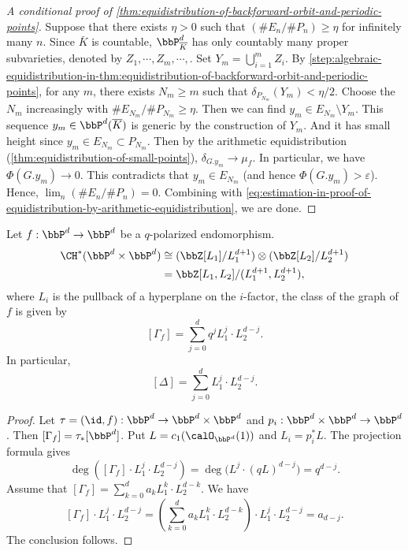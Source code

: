 \begin{proof}[A conditional proof of \cref{thm:equidistribution-of-backforward-orbit-and-periodic-points}]
	Suppose that there exists $\eta > 0$ such that $(\# E_n / \# P_n) \geq \eta$ for infinitely many $n$.
	Since $\bar K$ is countable, $\bbP^d_{\overline{K}}$ has only countably many proper subvarieties, denoted by $Z_1,\cdots,Z_m,\cdots,$.
	Set $Y_m = \bigcup_{i=1}^m Z_i$.
	By \cref{step:algebraic-equidistribution-in-thm:equidistribution-of-backforward-orbit-and-periodic-points}, for any $m$, there exists $N_m \geq m$ such that $\delta_{P_{N_m}}(Y_m) < \eta/2$.
	Choose the $N_m$ increasingly with $\#E_{N_m}/\#P_{N_m} \geq \eta$.
	Then we can find $y_m \in E_{N_m} \setminus Y_m$.
	This sequence $y_m \in \bbP^d(\overline{K})$ is generic by the construction of $Y_m$.
	And it has small height since $y_m \in E_{N_m} \subset P_{N_m}$.
	Then by the arithmetic equidistribution (\cref{thm:equidistribution-of-small-points}), $\delta_{G.y_m} \to \mu_f$.
	In particular, we have $\Phi(G.y_m) \to 0$.
	This contradicts that $y_m \in E_{N_m}$ (and hence $\Phi(G.y_m) > \varepsilon$).
	Hence, $\lim_{n} (\# E_n / \# P_n) = 0$.
	Combining with \cref{eq:estimation-in-proof-of-equidistribution-by-arithmetic-equidistribution}, we are done.
\end{proof}

\begin{lemma}[label=\labelNFM{lem:the-chow-cycle-of-graph-of-f-on-pn}, status=draft, tag=0000000]
	Let $f: \bbP^d \to \bbP^d$ be a $q$-polarized endomorphism.
	\begin{align*}
		\CH^*(\bbP^d\times\bbP^d) & \cong (\bbZ[L_1]/L_1^{d+1})\otimes(\bbZ[L_2]/L_2^{d+1}) \\
		                          & = \bbZ[L_1,L_2]/(L_1^{d+1},L_2^{d+1}),
	\end{align*}
	where $L_i$ is the pullback of a hyperplane on the $i$-factor, the class of the graph of $f$ is given by
	\[ [\Gamma_f] = \sum_{j = 0}^d q^j L_1^{j} \cdot L_2^{d-j}. \]
	In particular,
	\[ [\Delta] = \sum_{j = 0}^d L_1^{j} \cdot L_2^{d-j}. \]
\end{lemma}
\begin{proof}
	Let $\tau = (\id,f): \bbP^d \to \bbP^d \times \bbP^d$ and $p_i: \bbP^d \times \bbP^d \to \bbP^d$.
	Then $[\Gamma_f] = \tau_*[\bbP^d]$.
	Put $L = c_1(\calO_{\bbP^d}(1))$ and $L_i = p_i^*L$.
	The projection formula gives
	\[ \deg([\Gamma_f]\cdot L_1^j\cdot L_2^{d-j}) = \deg\bigl(L^j\cdot(qL)^{d-j}\bigr) = q^{d-j}. \]
	Assume that $[\Gamma_f] = \sum_{k = 0}^d a_k L_1^{k} \cdot L_2^{d-k}$.
	We have
	\[ [\Gamma_f] \cdot L_1^j \cdot L_2^{d-j} = \left( \sum_{k = 0}^d a_k L_1^{k} \cdot L_2^{d-k} \right) \cdot L_1^j \cdot L_2^{d-j} = a_{d-j}. \]
	The conclusion follows.
\end{proof}

